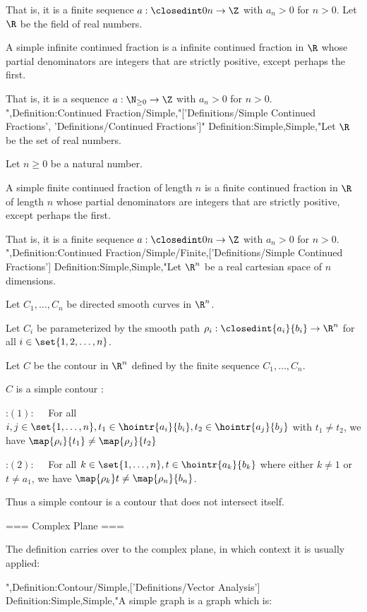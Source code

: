 That is, it is a finite sequence $a: \closedint 0 n \to \Z$ with $a_n > 0$ for $n > 0$.
Let $\R$ be the field of real numbers.


A simple infinite continued fraction is a infinite continued fraction in $\R$ whose partial denominators are integers that are strictly positive, except perhaps the first.

That is, it is a sequence $a: \N_{\ge 0} \to \Z$ with $a_n > 0$ for $n > 0$.
",Definition:Continued Fraction/Simple,"['Definitions/Simple Continued Fractions', 'Definitions/Continued Fractions']"
Definition:Simple,Simple,"Let $\R$ be the set of real numbers.

Let $n \ge 0$ be a natural number.


A simple finite continued fraction of length $n$ is a finite continued fraction in $\R$ of length $n$ whose partial denominators are integers that are strictly positive, except perhaps the first.

That is, it is a finite sequence $a: \closedint 0 n \to \Z$ with $a_n > 0$ for $n > 0$.
",Definition:Continued Fraction/Simple/Finite,['Definitions/Simple Continued Fractions']
Definition:Simple,Simple,"Let $\R^n$ be a real cartesian space of $n$ dimensions.

Let $C_1, \ldots, C_n$ be directed smooth curves in $\R^n$.

Let $C_i$ be parameterized by the smooth path $\rho_i: \closedint {a_i} {b_i} \to \R^n$ for all $i \in \set {1, 2, \ldots, n}$.

Let $C$ be the contour in $\R^n$ defined by the finite sequence $C_1, \ldots, C_n$.


$C$ is a simple contour :

:$(1): \quad$ For all $i, j \in \set {1, \ldots, n}, t_1 \in \hointr {a_i} {b_i}, t_2 \in \hointr {a_j} {b_j}$ with $t_1 \ne t_2$, we have $\map {\rho_i} {t_1} \ne \map {\rho_j} {t_2}$

:$(2): \quad$ For all $k \in \set {1, \ldots, n}, t \in \hointr {a_k} {b_k}$ where either $k \ne 1$ or $t \ne a_1$, we have $\map {\rho_k} t \ne \map {\rho_n} {b_n}$.


Thus a simple contour is a contour that does not intersect itself.


=== Complex Plane ===

The definition carries over to the complex plane, in which context it is usually applied:

",Definition:Contour/Simple,['Definitions/Vector Analysis']
Definition:Simple,Simple,"A simple graph is a graph which is:

